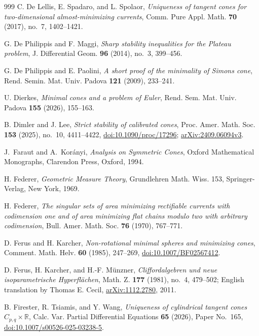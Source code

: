 \begin{thebibliography}{999}
C. De Lellis, E. Spadaro, and L. Spolaor,
\emph{Uniqueness of tangent cones for two-dimensional almost-minimizing
currents}, Comm. Pure Appl. Math. \textbf{70} (2017), no.~7, 1402--1421.

G. De Philippis and F. Maggi,
\emph{Sharp stability inequalities for the Plateau problem},
J. Differential Geom. \textbf{96} (2014), no.~3, 399--456.

G. De Philippis and E. Paolini,
\emph{A short proof of the minimality of Simons cone},
Rend. Semin. Mat. Univ. Padova \textbf{121} (2009), 233--241.

U. Dierkes,
\emph{Minimal cones and a problem of Euler},
Rend. Sem. Mat. Univ. Padova \textbf{155} (2026), 155--163.

B. Dimler and J. Lee,
\emph{Strict stability of calibrated cones},
Proc. Amer. Math. Soc. \textbf{153} (2025), no.~10, 4411--4422,
\href{https://doi.org/10.1090/proc/17296}{doi:10.1090/proc/17296};
\href{https://arxiv.org/abs/2409.06094v3}{arXiv:2409.06094v3}.

J.~Faraut and A.~Kor\'anyi,
\emph{Analysis on Symmetric Cones},
Oxford Mathematical Monographs, Clarendon Press, Oxford, 1994.

H. Federer,
\emph{Geometric Measure Theory},
Grundlehren Math. Wiss. 153, Springer-Verlag, New York, 1969.

H. Federer,
\emph{The singular sets of area minimizing rectifiable currents with
codimension one and of area minimizing flat chains modulo two with
arbitrary codimension}, Bull. Amer. Math. Soc. \textbf{76} (1970), 767--771.

D. Ferus and H. Karcher,
\emph{Non-rotational minimal spheres and minimizing cones},
Comment. Math. Helv. \textbf{60} (1985), 247--269,
\href{https://doi.org/10.1007/BF02567412}{doi:10.1007/BF02567412}.

D. Ferus, H. Karcher, and H.-F. M\"unzner,
\emph{Cliffordalgebren und neue isoparametrische Hyperfl\"achen},
Math. Z. \textbf{177} (1981), no.~4, 479--502;
English translation by Thomas E. Cecil,
\href{https://arxiv.org/abs/1112.2780}{arXiv:1112.2780}, 2011.

B. Firester, R. Tsiamis, and Y. Wang,
\emph{Uniqueness of cylindrical tangent cones $C_{p,q}\times\mathbb{R}$},
Calc. Var. Partial Differential Equations \textbf{65} (2026),
Paper No.~165,
\href{https://doi.org/10.1007/s00526-025-03238-5}{doi:10.1007/s00526-025-03238-5}.


\end{thebibliography}
